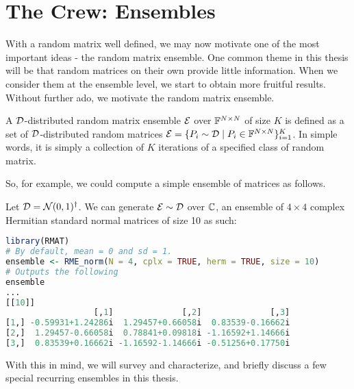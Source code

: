 
\section{The Crew: Ensembles}

With a random matrix well defined, we may now motivate one of the most important ideas - the random matrix ensemble. One common theme in this thesis will be that random matrices on their own provide little information. When we consider them at the ensemble level, we start to obtain more fruitful results. Without further ado, we motivate the random matrix ensemble.

\begin{definition}
A $\mathcal{D}$-distributed random matrix ensemble $\mathcal{E}$ over $\mathbb{F}^{N \times N}$ of size $K$ is defined as a set of $\mathcal{D}$-distributed random matrices $\mathcal{E} = \{P_i \sim \mathcal{D} \mid P_i \in \mathbb{F}^{N \times N}\}_{i = 1}^K$. In simple words, it is simply a collection of $K$ iterations of a specified class of random matrix.
\end{definition}

\medskip
\noindent So, for example, we could compute a simple ensemble of matrices as follows.
\begin{code}
Let $\mathcal{D} = \mathcal{N}(0,1)^{\dagger}$. We can generate $\mathcal{E} \sim \mathcal{D}$ over $\mathbb{C}$, an ensemble of $4 \times 4$ complex Hermitian standard normal matrices of size 10 as such:
\end{code}

\begin{lstlisting}[language=R]
library(RMAT)
# By default, mean = 0 and sd = 1.
ensemble <- RME_norm(N = 4, cplx = TRUE, herm = TRUE, size = 10)
# Outputs the following
ensemble
...
[[10]]
                  [,1]              [,2]              [,3]
[1,] -0.59931+1.24286i  1.29457+0.66058i  0.83539-0.16662i
[2,]  1.29457-0.66058i  0.78841+0.09818i -1.16592+1.14666i
[3,]  0.83539+0.16662i -1.16592-1.14666i -0.51256+0.17750i
\end{lstlisting}

With this in mind, we will survey and characterize, and briefly discuss a few special recurring ensembles in this thesis.


